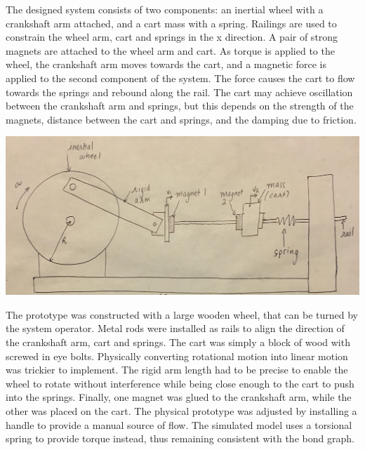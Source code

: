 \documentclass[notitlepage,10pt]{report}
\newenvironment{Figure}
  {\par\medskip\noindent\minipage{\linewidth}}
  {\endminipage\par\medskip}
\begin{document}
\begin{multicols}{2}
The designed system consists of two components: an inertial wheel with a crankshaft arm attached, and a cart mass with a spring. Railings are used to constrain the wheel arm, cart and springs in the x direction. A pair of strong magnets are attached to the wheel arm and cart. As torque is applied to the wheel, the crankshaft arm moves towards the cart, and a magnetic force is applied to the second component of the system. The force causes the cart to flow towards the springs and rebound along the rail. The cart may achieve oscillation between the crankshaft arm and springs, but this depends on the strength of the magnets, distance between the cart and springs, and the damping due to friction.
\begin{Figure}
 \centering
   \includegraphics[width=\linewidth]{schematic}
   \label{fig:systemSchematic}
\end{Figure}
The prototype was constructed with a large wooden wheel, that can be turned by the system operator. Metal rods were installed as rails to align the direction of the crankshaft arm, cart and springs. The cart was simply a block of wood with screwed in eye bolts. Physically converting rotational motion into linear motion was trickier to implement. The rigid arm length had to be precise to enable the wheel to rotate without interference while being close enough to the cart to push into the springs. Finally, one magnet was glued to the crankshaft arm, while the other was placed on the cart. The physical prototype was adjusted by installing a handle to provide a manual source of flow. The simulated model uses a torsional spring to provide torque instead, thus remaining consistent with the bond graph.
\begin{Figure}
 \centering

\end{Figure}
\end{multicols}
\end{document}
